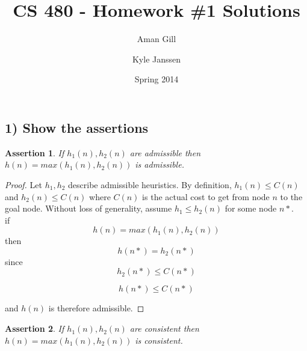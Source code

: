\documentclass{article}
\newtheorem{assertion}{Assertion}
\begin{document}
\title{CS 480 - Homework \#1 Solutions}
\author{Aman Gill \and Kyle Janssen}
\date{Spring 2014}
\maketitle

\subsection*{1) Show the assertions}

\begin{assertion}
	If $h_{1}(n), h_{2}(n)$ are admissible then $h(n) = max(h_{1}(n), h_{2}(n))$ is admissible.
\end{assertion}

\begin{proof}

	Let $h_{1}, h_{2}$ describe admissible heuristics. By definition, $h_{1}(n) \leq C(n)$ and $h_{2}(n) \leq C(n)$ where $C(n)$ is the actual cost to get from node $n$ to the goal node. Without loss of generality, assume $h_{1} \leq h_{2}(n)$ for some node $n*$.\\

	if \[h(n) = max(h_{1}(n), h_{2}(n))\]
	then \[h(n*) = h_{2}(n*)\]
	since \[h_{2}(n*) \leq C(n*)\]

	\[h(n*) \leq C(n*)\]

	and $h(n)$ is therefore admissible.
\end{proof}

\begin{assertion}
	If $h_{1}(n), h_{2}(n)$ are consistent then $h(n) = max(h_{1}(n), h_{2}(n))$ is consistent.
\end{assertion}
\end{document}
